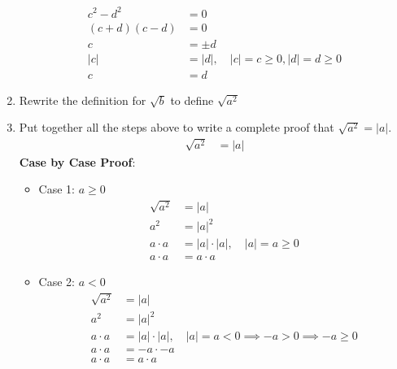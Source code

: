 \documentclass{article}
\begin{document}
\begin{enumerate}[label = \textbf{\alph*)}]
\begin{align*}
			c^2 - d^2 & = 0 \\
			(c + d)(c - d) & = 0 \\
			c & = \pm d \\
			|c| & = |d|, \quad |c| = c \geq 0, |d| = d \geq 0 \\
			c & = d
		\end{align*}
	\item Rewrite the definition for $ \sqrt{b} $ to define $ \sqrt{ a^2 } $
	\item Put together all the steps above to write a complete proof that $ \sqrt{ a^2 } = |a| $.
		\begin{align*}
			\sqrt{ a^2 } & = |a|
		\end{align*}
		\textbf{Case by Case Proof}:
		\begin{itemize}
			\item Case 1: $ a \geq 0 $
				\begin{align*}
					\sqrt{ a^2 } & = |a| \\
					a^2 & = |a|^2 \\
					a \cdot a & = |a| \cdot |a|, \quad |a| = a \geq 0 \\
					a \cdot a & = a \cdot a
				\end{align*}
			\item Case 2: $ a < 0 $
				\begin{align*}
					\sqrt{ a^2 } & = |a| \\
					a^2 & = |a|^2 \\
					a \cdot a & = |a| \cdot |a|, \quad |a| = a < 0 \implies -a > 0 \implies -a \geq 0 \\
					a \cdot a & = -a \cdot -a \\
					a \cdot a & = a \cdot a
				\end{align*}
		\end{itemize}
\end{enumerate}
\end{document}
